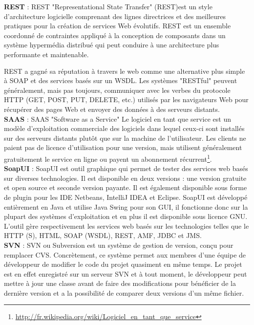 \textbf{REST} : REST "Representational State Transfer" (REST) ​​est un style d'architecture logicielle comprenant des lignes directrices et des meilleures pratiques pour la création de services Web évolutifs. REST est un ensemble coordonné de contraintes appliqué à la conception de composants dans un système hypermédia distribué qui peut conduire à une architecture plus performante et maintenable.

REST a gagné sa réputation à travers le web comme une alternative plus simple à SOAP et des services basés sur un WSDL. Les systèmes "RESTful" peuvent généralement, mais pas toujours, communiquer avec les verbes du protocole HTTP (GET, POST, PUT, DELETE, etc.) utilisés par les navigateurs Web pour récupérer des pages Web et envoyer des données à des serveurs distants.\\


\textbf{SAAS} : SAAS "Software as a Service" Le logiciel en tant que service est un modèle d'exploitation commerciale des logiciels dans lequel ceux-ci sont installés sur des serveurs distants plutôt que sur la machine de l'utilisateur. Les clients ne paient pas de licence d'utilisation pour une version, mais utilisent généralement gratuitement le service en ligne ou payent un abonnement récurrent\footnote{\url{http://fr.wikipedia.org/wiki/Logiciel_en_tant_que_service}}.\\

\textbf{SoapUI} : SoapUI est outil graphique qui permet de tester des services web basés sur diverses technologies. Il est disponible en deux versions : une version gratuite et open source et seconde version payante. Il est également disponible sous forme de plugin pour les IDE Netbeans, IntelliJ IDEA et Eclipse. SoapUI est développé entièrement en Java et utilise Java Swing pour son GUI, il fonctionne donc sur la plupart des systèmes d'exploitation et en plus il est disponible sous licence GNU.
L'outil gère respectivement les services web basés sur les technologies telles que le HTTP (S), HTML, SOAP (WSDL), REST, AMF, JDBC et JMS.\\

\textbf{SVN} : SVN ou Subversion est un système de gestion de version, conçu pour remplacer CVS. Concrètement, ce système permet aux membres d’une équipe de développeur de modifier le code du projet quasiment en même temps. Le projet est en effet enregistré sur un serveur SVN et à tout moment, le développeur peut mettre à jour une classe avant de faire des modifications pour bénéficier de la dernière version et a la possibilité de comparer deux versions d'un même fichier.\\

